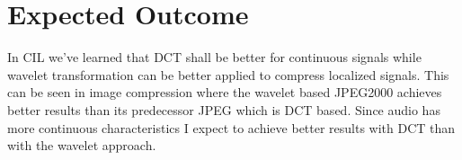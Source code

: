 \documentclass[a4paper]{article}
\begin{document}
\section{Expected Outcome}

In CIL we've learned that DCT shall be better for continuous signals while
wavelet transformation can be better applied to compress localized signals. This
can be seen in image compression where the wavelet based JPEG2000 achieves
better results than its predecessor JPEG which is DCT based. Since audio has
more continuous characteristics I expect to achieve better results with DCT than
with the wavelet approach.


%

%

\end{document}
